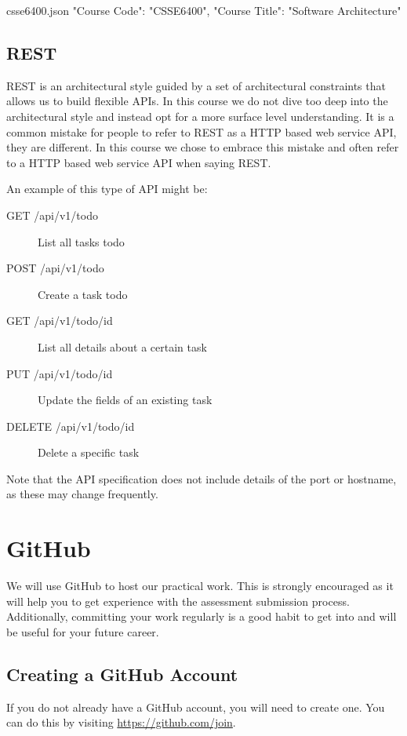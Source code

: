 \documentclass{csse4400}
\begin{document}
\begin{code}[language=json]{csse6400.json}
{
    "Course Code": "CSSE6400",
    "Course Title": "Software Architecture"
}
\end{code}

\subsection{REST}
REST is an architectural style guided by a set of architectural constraints that allows us to build flexible APIs.
In this course we do not dive too deep into the architectural style and instead opt for a more surface level understanding.
It is a common mistake for people to refer to REST as a HTTP based web service API,
they are different.
In this course we chose to embrace this mistake and often refer to a HTTP based web service API when saying REST.

\noindent An example of this type of API might be:
\begin{description}
  \item[GET /api/v1/todo] List all tasks todo
  \item[POST /api/v1/todo] Create a task todo
  \item[GET /api/v1/todo/{id}] List all details about a certain task
  \item[PUT /api/v1/todo/{id}] Update the fields of an existing task
  \item[DELETE /api/v1/todo/{id}] Delete a specific task
\end{description}
Note that the API specification does not include details of the port or hostname, as these may change frequently.


\section{GitHub}

We will use GitHub to host our practical work.
This is strongly encouraged as it will help you to get experience with the assessment submission process.
Additionally, committing your work regularly is a good habit to get into and will be useful for your future career.

\subsection{Creating a GitHub Account}
If you do not already have a GitHub account, you will need to create one.
You can do this by visiting \url{https://github.com/join}.
\end{document}
